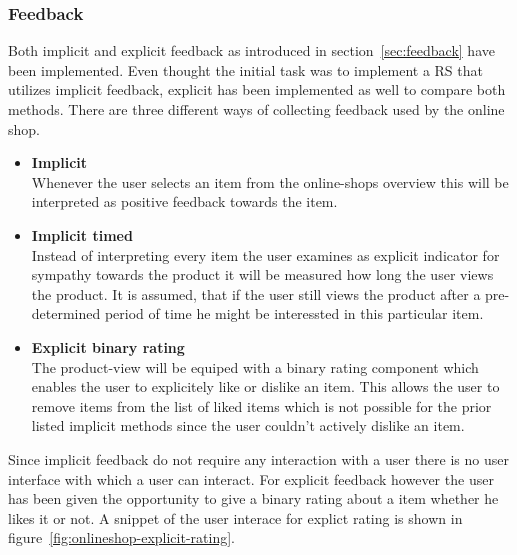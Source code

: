 \subsubsection{Feedback}
\label{sec:onlineshop-feedback}
Both implicit and explicit feedback as introduced in section~\ref{sec:feedback} have been implemented.
Even thought the initial task was to implement a RS that utilizes implicit feedback, explicit has been implemented as well to compare both methods.
There are three different ways of collecting feedback used by the online shop.
\begin{itemize}
    \item \textbf{Implicit}\hfill\\
        Whenever the user selects an item from the online-shops overview this will be interpreted as positive feedback towards the item.
    \item \textbf{Implicit timed}\hfill\\
        Instead of interpreting every item the user examines as explicit indicator for sympathy towards the product it will be measured how long the user views the product.
        It is assumed, that if the user still views the product after a pre-determined period of time he might be interessted in this particular item.
    \item \textbf{Explicit binary rating}\\
        The product-view will be equiped with a binary rating component which enables the user to explicitely like or dislike an item.
        This allows the user to remove items from the list of liked items which is not possible for the prior listed implicit methods since the user couldn't actively dislike an item.
\end{itemize}

Since implicit feedback do not require any interaction with a user there is no user interface with which a user can interact.
For explicit feedback however the user has been given the opportunity to give a binary rating about a item whether he likes it or not.
A snippet of the user interace for explict rating is shown in figure~\ref{fig:onlineshop-explicit-rating}.

